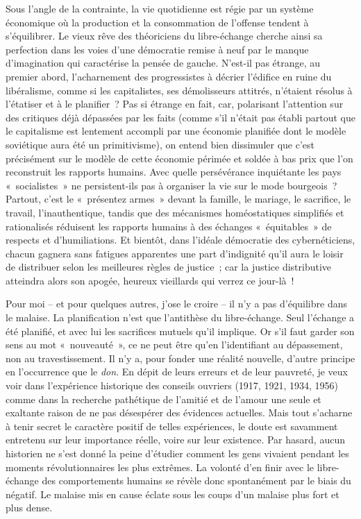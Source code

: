 \documentclass[french,twoside]{book} %
\begin{document}
Sous l’angle de la contrainte, la vie quotidienne est régie par un système économique où la production et la consommation de l’offense tendent à s’équilibrer. Le vieux rêve des théoriciens du libre-échange cherche ainsi sa perfection dans les voies d’une démocratie remise à neuf par le manque d’imagination qui caractérise la pensée de gauche. N’est-il pas étrange, au premier abord, l’acharnement des progressistes à décrier l’édifice en ruine du libéralisme, comme si les capitalistes, ses démolisseurs attitrés, n’étaient résolus à l’étatiser et à le planifier ? Pas si étrange en fait, car, polarisant l’attention sur des critiques déjà dépassées par les faits (comme s’il n’était pas établi partout que le capitalisme est lentement accompli par une économie planifiée dont le modèle soviétique aura été un primitivisme), on entend bien dissimuler que c’est précisément sur le modèle de cette économie périmée et soldée à bas prix que l’on reconstruit les rapports humains. Avec quelle persévérance inquiétante les pays « socialistes » ne persistent-ils pas à organiser la vie sur le mode bourgeois ? Partout, c’est le « présentez armes » devant la famille, le mariage, le sacrifice, le travail, l’inauthentique, tandis que des mécanismes homéostatiques simplifiés et rationalisés réduisent les rapports humains à des échanges « équitables » de respects et d’humiliations. Et bientôt, dans l’idéale démocratie des cybernéticiens, chacun gagnera sans fatigues apparentes une part d’indignité qu’il aura le loisir de distribuer selon les meilleures règles de justice ; car la justice distributive atteindra alors son apogée, heureux vieillards qui verrez ce jour-là !\par
Pour moi – et pour quelques autres, j’ose le croire – il n’y a pas d’équilibre dans le malaise. La planification n’est que l’antithèse du libre-échange. Seul l’échange a été planifié, et avec lui les sacrifices mutuels qu’il implique. Or s’il faut garder son sens au mot « nouveauté », ce ne peut être qu’en l’identifiant au dépassement, non au travestissement. Il n’y a, pour fonder une réalité nouvelle, d’autre principe en l’occurrence que le \emph{don}. En dépit de leurs erreurs et de leur pauvreté, je veux voir dans l’expérience historique des conseils ouvriers (1917, 1921, 1934, 1956) comme dans la recherche pathétique de l’amitié et de l’amour une seule et exaltante raison de ne pas désespérer des évidences actuelles. Mais tout s’acharne à tenir secret le caractère positif de telles expériences, le doute est savamment entretenu sur leur importance réelle, voire sur leur existence. Par hasard, aucun historien ne s’est donné la peine d’étudier comment les gens vivaient pendant les moments révolutionnaires les plus extrêmes. La volonté d’en finir avec le libre-échange des comportements humains se révèle donc spontanément par le biais du négatif. Le malaise mis en cause éclate sous les coups d’un malaise plus fort et plus dense.\par
\end{document}

